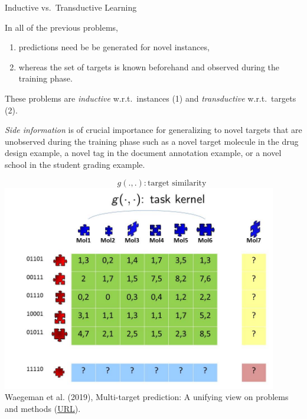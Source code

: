 \begin{frame}{Inductive vs.\ Transductive Learning}
	\small
	\begin{itemize} 
		\item In all of the previous problems, 
		\begin{enumerate} \small
			\item predictions need be be generated for novel instances, 
			\item whereas the set of targets is known beforehand and observed during the training phase.
		\end{enumerate}
		\item[$\leadsto$] These problems are \emph{inductive} w.r.t.\ instances (1) and \emph{transductive} w.r.t.\ targets (2).
		\item  [] 

		\begin{minipage}{0.45\textwidth}    
			\item []
			\item 	\emph{Side information} is of crucial importance for generalizing to novel targets that are unobserved during the training phase such as a novel target molecule in the drug design example, a novel tag in the document annotation example, or a novel school in the student grading example. 
			\item[]
		\end{minipage}
		\begin{minipage}{0.4\textwidth}    
			\begin{center}
				\tiny{$$\qquad g(.,.): \mbox{target similarity}$$}
				\includegraphics[width=0.9\textwidth,trim = 0 0 0 50,clip]{figure/Slide7}  \tiny
				\\ Waegeman et al. (2019), Multi-target prediction:
				A unifying view on problems and methods (\href{https://arxiv.org/pdf/1809.02352.pdf}{\underline{URL}}).
			\end{center}
		\end{minipage}
	\end{itemize}
\end{frame}

